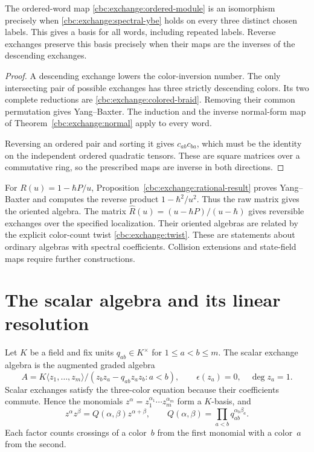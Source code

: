\begin{theorem}\label{thm:zf-diamond}
The ordered-word map \eqref{cbc:exchange:ordered-module} is an isomorphism
precisely when \eqref{cbc:exchange:spectral-ybe} holds on every three
distinct chosen labels.  This gives a basis for all words,
including repeated labels.  Reverse exchanges preserve this basis
precisely when their maps are the inverses of the descending exchanges.
\end{theorem}
\begin{proof}
A descending exchange lowers the color-inversion number.  The only
intersecting pair of possible exchanges has three strictly descending
colors.  Its two complete reductions are
\eqref{cbc:exchange:colored-braid}.  Removing their common permutation
gives Yang--Baxter.  The induction and the inverse normal-form map of
Theorem~\ref{cbc:exchange:normal} apply to every word.

Reversing an ordered pair and sorting it gives $c_{ab}c_{ba}$,
which must be the identity on the independent ordered quadratic tensors.
These are square matrices over a commutative ring, so the prescribed maps
are inverse in both directions.
\end{proof}

For $R(u)=1-\hbar P/u$, Proposition~\ref{cbc:exchange:rational-result}
proves Yang--Baxter and computes the reverse product $1-\hbar^2/u^2$.
Thus the raw matrix gives the oriented algebra.  The matrix
$\widehat R(u)=(u-\hbar P)/(u-\hbar)$ gives reversible exchanges over the
specified localization.  Their oriented algebras are related by the
explicit color-count twist \eqref{cbc:exchange:twist}.
These are statements about ordinary algebras with spectral coefficients.
Collision extensions and state-field maps require further constructions.

\section{The scalar algebra and its linear resolution}
Let $K$ be a field and fix units $q_{ab}\in K^\times$ for $1\leq a<b\leq m$.
The scalar exchange algebra is the augmented graded algebra
\begin{equation}\label{cbc:zf:scalar}
 A=K\langle z_1,\ldots,z_m\rangle/
       (z_bz_a-q_{ab}z_az_b:a<b),\qquad
 \epsilon(z_a)=0,\quad \deg z_a=1.
\end{equation}
Scalar exchanges satisfy the three-color equation because their
coefficients commute.  Hence the monomials
$z^\alpha=z_1^{\alpha_1}\cdots z_m^{\alpha_m}$ form a $K$-basis, and
\begin{equation}\label{cbc:zf:product}
 z^\alpha z^\beta
 =Q(\alpha,\beta)z^{\alpha+\beta},\qquad
 Q(\alpha,\beta)=\prod_{a<b}q_{ab}^{\alpha_b\beta_a}.
\end{equation}
Each factor counts crossings of a color~$b$ from the first monomial
with a color~$a$ from the second.

